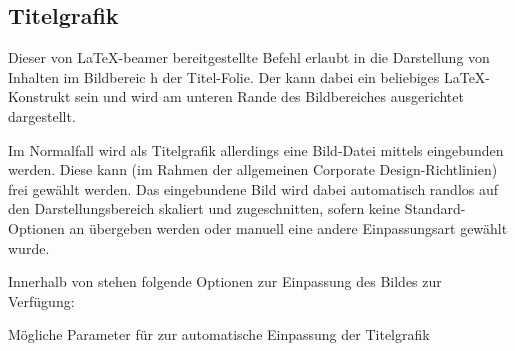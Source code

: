 \subsection{Titelgrafik}

\begin{Declaration}
\end{Declaration}

\begin{sloppypar}
Dieser von \LaTeX-beamer bereitgestellte Befehl erlaubt in \tubslatex
die Darstellung von Inhalten im Bildbereic  h der Titel-Folie.
Der  kann dabei ein beliebiges \LaTeX-Konstrukt sein
und wird am unteren Rande des Bildbereiches ausgerichtet dargestellt.

Im Normalfall wird als Titelgrafik allerdings eine Bild-Datei mittels
 eingebunden werden.
Diese kann (im Rahmen der allgemeinen Corporate Design-Richtlinien)%
frei gewählt werden.
Das eingebundene Bild wird dabei automatisch randlos
auf den Darstellungsbereich skaliert und zugeschnitten, sofern keine
Standard-Optionen an  übergeben werden oder
manuell eine andere Einpassungsart gewählt wurde.

Innerhalb von  stehen folgende
Optionen zur Einpassung des Bildes zur Verfügung:
\end{sloppypar}

\begin{desctable}
\toprule
{}
\bottomrule
\caption{Mögliche Parameter für  zur
automatische Einpassung der Titelgrafik}
\end{desctable}

